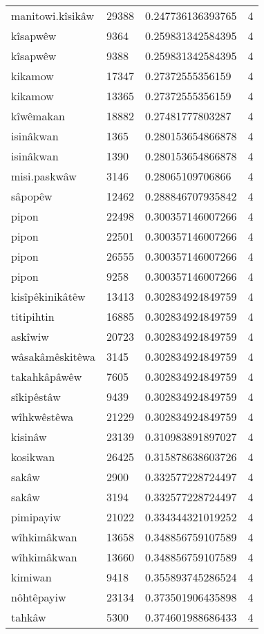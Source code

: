\begin{longtable}{llll}
manitowi.kîsikâw & 29388 & 0.247736136393765 & 4 \\
kîsapwêw & 9364 & 0.259831342584395 & 4 \\
kîsapwêw & 9388 & 0.259831342584395 & 4 \\
kikamow & 17347 & 0.27372555356159 & 4 \\
kikamow & 13365 & 0.27372555356159 & 4 \\
kîwêmakan & 18882 & 0.27481777803287 & 4 \\
isinâkwan & 1365 & 0.280153654866878 & 4 \\
isinâkwan & 1390 & 0.280153654866878 & 4 \\
misi.paskwâw & 3146 & 0.28065109706866 & 4 \\
sâpopêw & 12462 & 0.288846707935842 & 4 \\
pipon & 22498 & 0.300357146007266 & 4 \\
pipon & 22501 & 0.300357146007266 & 4 \\
pipon & 26555 & 0.300357146007266 & 4 \\
pipon & 9258 & 0.300357146007266 & 4 \\
kisîpêkinikâtêw & 13413 & 0.302834924849759 & 4 \\
titipihtin & 16885 & 0.302834924849759 & 4 \\
askîwiw & 20723 & 0.302834924849759 & 4 \\
wâsakâmêskitêwa & 3145 & 0.302834924849759 & 4 \\
takahkâpâwêw & 7605 & 0.302834924849759 & 4 \\
sîkipêstâw & 9439 & 0.302834924849759 & 4 \\
wîhkwêstêwa & 21229 & 0.302834924849759 & 4 \\
kisinâw & 23139 & 0.310983891897027 & 4 \\
kosikwan & 26425 & 0.315878638603726 & 4 \\
sakâw & 2900 & 0.332577228724497 & 4 \\
sakâw & 3194 & 0.332577228724497 & 4 \\
pimipayiw & 21022 & 0.334344321019252 & 4 \\
wîhkimâkwan & 13658 & 0.348856759107589 & 4 \\
wîhkimâkwan & 13660 & 0.348856759107589 & 4 \\
kimiwan & 9418 & 0.355893745286524 & 4 \\
nôhtêpayiw & 23134 & 0.373501906435898 & 4 \\
tahkâw & 5300 & 0.374601988686433 & 4 \\

\end{longtable}
